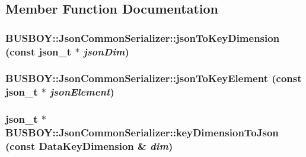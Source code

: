 \subsection{Member Function Documentation}
\hypertarget{classBUSBOY_1_1JsonCommonSerializer_a7508db323d150f335aa4295484797b41}{
\subsubsection[{jsonToKeyDimension}]{ BUSBOY::JsonCommonSerializer::jsonToKeyDimension (const json\_\-t $\ast$ {\em jsonDim})}}
\label{classBUSBOY_1_1JsonCommonSerializer_a7508db323d150f335aa4295484797b41}
\hypertarget{classBUSBOY_1_1JsonCommonSerializer_abdc3e20058d1224944ac1dd63be20ff3}{
\subsubsection[{jsonToKeyElement}]{ BUSBOY::JsonCommonSerializer::jsonToKeyElement (const json\_\-t $\ast$ {\em jsonElement})}}
\label{classBUSBOY_1_1JsonCommonSerializer_abdc3e20058d1224944ac1dd63be20ff3}
\hypertarget{classBUSBOY_1_1JsonCommonSerializer_a84be97d2ce2c6c4093e6711c3386c789}{
\subsubsection[{keyDimensionToJson}]{\setlength{\rightskip}{0pt plus 5cm}json\_\-t $\ast$ BUSBOY::JsonCommonSerializer::keyDimensionToJson (const {\bf DataKeyDimension} \& {\em dim})}}
\label{classBUSBOY_1_1JsonCommonSerializer_a84be97d2ce2c6c4093e6711c3386c789}
